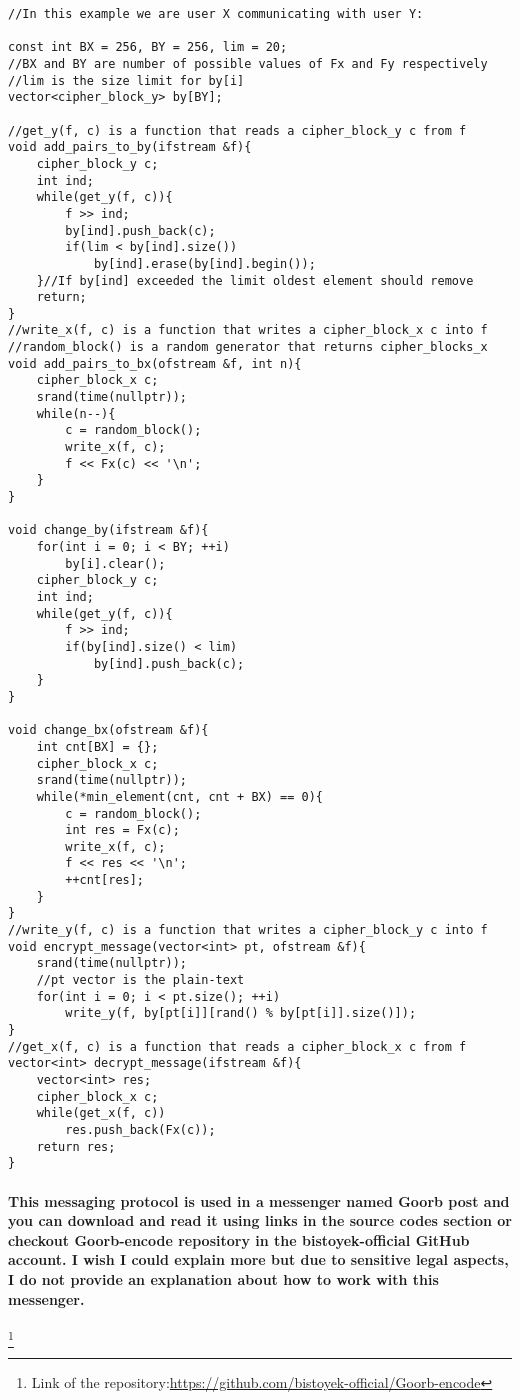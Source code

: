 \documentclass[oneside]{book}
\newcommand{\myparagraph}[1]{\paragraph{\textnormal{#1}}}
\begin{document}
\begin{lstlisting}
//In this example we are user X communicating with user Y:

const int BX = 256, BY = 256, lim = 20;
//BX and BY are number of possible values of Fx and Fy respectively
//lim is the size limit for by[i]
vector<cipher_block_y> by[BY];

//get_y(f, c) is a function that reads a cipher_block_y c from f
void add_pairs_to_by(ifstream &f){
    cipher_block_y c;
    int ind;
    while(get_y(f, c)){
        f >> ind;
        by[ind].push_back(c);
        if(lim < by[ind].size())
            by[ind].erase(by[ind].begin());
    }//If by[ind] exceeded the limit oldest element should remove
    return;
}
//write_x(f, c) is a function that writes a cipher_block_x c into f
//random_block() is a random generator that returns cipher_blocks_x
void add_pairs_to_bx(ofstream &f, int n){
    cipher_block_x c;
    srand(time(nullptr));
    while(n--){
        c = random_block();
        write_x(f, c);
        f << Fx(c) << '\n';
    }
}

void change_by(ifstream &f){
    for(int i = 0; i < BY; ++i)
        by[i].clear();
    cipher_block_y c;
    int ind;
    while(get_y(f, c)){
        f >> ind;
        if(by[ind].size() < lim)
            by[ind].push_back(c);
    }
}

void change_bx(ofstream &f){
    int cnt[BX] = {};
    cipher_block_x c;
    srand(time(nullptr));
    while(*min_element(cnt, cnt + BX) == 0){
        c = random_block();
        int res = Fx(c);
        write_x(f, c);
        f << res << '\n';
        ++cnt[res];
    }
}
//write_y(f, c) is a function that writes a cipher_block_y c into f
void encrypt_message(vector<int> pt, ofstream &f){
    srand(time(nullptr));
    //pt vector is the plain-text
    for(int i = 0; i < pt.size(); ++i)
        write_y(f, by[pt[i]][rand() % by[pt[i]].size()]);
}
//get_x(f, c) is a function that reads a cipher_block_x c from f
vector<int> decrypt_message(ifstream &f){
    vector<int> res;
    cipher_block_x c;
    while(get_x(f, c))
        res.push_back(Fx(c));
    return res;
}
\end{lstlisting}

\myparagraph{
This messaging protocol is used in a messenger named \textbf{Goorb post} and you can download and read it using links in the source codes section or checkout Goorb-encode repository in the bistoyek-official GitHub account. I wish I could explain more but due to sensitive legal aspects, I do not provide an explanation about how to work with this messenger.
}
\footnote{Link of the repository:\newline \href{https://github.com/bistoyek-official/Goorb-encode}{https://github.com/bistoyek-official/Goorb-encode}}
\end{document}
